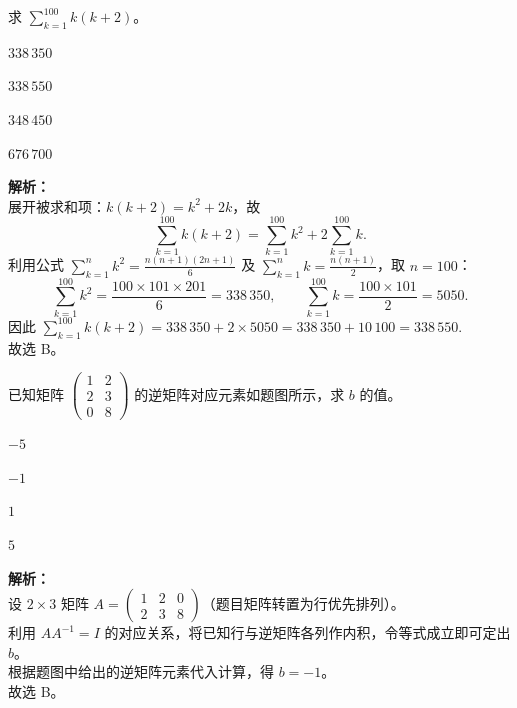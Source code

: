 \documentclass[12pt,a4paper]{exam-zh}
\begin{document}
\begin{question}
    求 $\displaystyle\sum_{k=1}^{100}k(k+2)$。\paren[B]
    \begin{choices}
        \item $338\,350$ \item $338\,550$ \item $348\,450$ \item $676\,700$
    \end{choices}
\end{question}

\begin{solution}
    \textbf{解析：} \\
    展开被求和项：$k(k+2)=k^2+2k$，故
    \[
        \sum_{k=1}^{100}k(k+2)=\sum_{k=1}^{100}k^2+2\sum_{k=1}^{100}k.
    \]
    利用公式 $\displaystyle\sum_{k=1}^{n}k^2=\frac{n(n+1)(2n+1)}{6}$ 及 $\displaystyle\sum_{k=1}^{n}k=\frac{n(n+1)}{2}$，取 $n=100$：
    \[
        \sum_{k=1}^{100}k^2=\frac{100\times101\times201}{6}=338\,350,\qquad
        \sum_{k=1}^{100}k=\frac{100\times101}{2}=5050.
    \]
    因此 $\displaystyle\sum_{k=1}^{100}k(k+2)=338\,350+2\times5050=338\,350+10\,100=338\,550$. \\
    故选 B。
\end{solution}

\begin{question}
    已知矩阵 $\begin{pmatrix}1&2\\2&3\\0&8\end{pmatrix}$ 的逆矩阵对应元素如题图所示，求 $b$ 的值。\paren[B]
    \begin{choices}
        \item $-5$ \item $-1$ \item $1$ \item $5$
    \end{choices}
\end{question}

\begin{solution}
    \textbf{解析：} \\
    设 $2\times3$ 矩阵 $A=\begin{pmatrix}1&2&0\\2&3&8\end{pmatrix}$（题目矩阵转置为行优先排列）。 \\
    利用 $AA^{-1}=I$ 的对应关系，将已知行与逆矩阵各列作内积，令等式成立即可定出 $b$。 \\
    根据题图中给出的逆矩阵元素代入计算，得 $b=-1$。 \\
    故选 B。
\end{solution}
\end{document}
